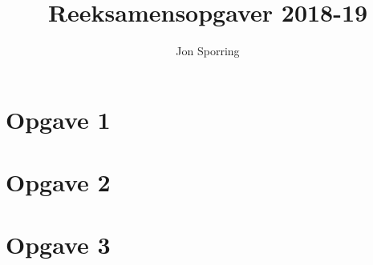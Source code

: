 \documentclass[a4paper,12pt]{article}
\title{Reeksamensopgaver 2018-19}
\author{Jon Sporring}
\begin{document}
\maketitle

\newpage
\section{Opgave 1}


\newpage
\section{Opgave 2}


\newpage
\section{Opgave 3}

\end{document}
